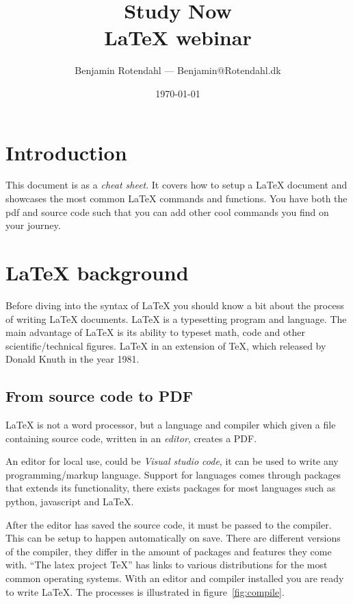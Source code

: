 \documentclass{article}
\title{
  \vspace{13em}
  \large{Study Now} \\
  \Large{\LaTeX{} webinar} \\
}
\author{
  Benjamin Rotendahl --- Benjamin@Rotendahl.dk
}
\date{
  \vspace{22em}
  \today
}
\begin{document}
\clearpage

\maketitle
\thispagestyle{empty}
\newpage

\thispagestyle{empty}\tableofcontents\newpage %

\setcounter{page}{1}

\section{Introduction}
 This document is as a \emph{cheat sheet}. It covers how to setup a \LaTeX{}
 document and showcases the most common \LaTeX{} commands and functions. You
 have both the pdf and source code such that you can add other cool commands
 you find on your journey.

\section{\LaTeX{} background}
 Before diving into the syntax of \LaTeX{} you should know a bit about the
 process of writing \LaTeX{} documents. \LaTeX{} is a typesetting program and
 language. The main advantage of \LaTeX{} is its ability to typeset math, code
 and other scientific/technical figures. \LaTeX{} in an extension of TeX, which
 released by Donald Knuth in the year 1981.

 \subsection{From source code to PDF}\label{sec:local}
   \LaTeX{} is not a word processor, but a language and compiler which given a
   file containing source code, written in an \emph{editor}, creates a PDF.

   An editor for local use, could be \emph{Visual studio code}\cite{vscode}, it
   can be used to write any programming/markup language. Support for languages
   comes through packages that extends its functionality, there exists packages
   for most languages such as python, javascript and \LaTeX{}\cite{latexPackage}.

   After the editor has saved the source code, it must be passed to the compiler.
   This can be setup to happen automatically on save. There are different versions
   of the compiler, they differ in the amount of packages and features they come
   with.  ``The latex project TeX''\cite{texLive} has links to various distributions
   for the most common operating systems.
   With an editor and compiler installed you are ready to write \LaTeX{}.
   The processes is illustrated in figure~\ref{fig:compile}.
\end{document}
